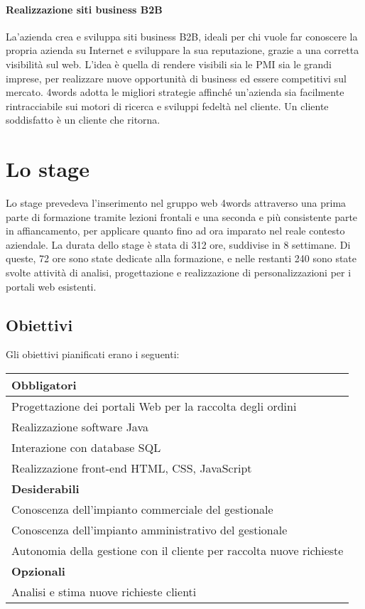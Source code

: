 \paragraph{Realizzazione siti business B2B} La'azienda crea e sviluppa siti business B2B, ideali per chi vuole far conoscere la propria azienda su Internet e sviluppare la sua reputazione, grazie a una corretta visibilità sul web.
L'idea è quella di rendere visibili sia le PMI sia le grandi imprese, per realizzare nuove opportunità di business ed essere competitivi sul mercato. 4words adotta le migliori strategie affinché un'azienda sia facilmente rintracciabile sui motori di ricerca e sviluppi fedeltà nel cliente. Un cliente soddisfatto è un cliente che ritorna.

\section{Lo stage}
Lo stage prevedeva l'inserimento nel gruppo web 4words attraverso una prima parte di formazione tramite lezioni frontali e una seconda e più consistente parte in affiancamento, per applicare quanto fino ad ora imparato nel reale contesto aziendale. La durata dello stage è stata di 312 ore, suddivise in 8 settimane. Di queste, 72 ore sono state dedicate alla formazione, e nelle restanti 240 sono state svolte attività di analisi, progettazione e realizzazione di personalizzazioni per i portali web esistenti.

\subsection{Obiettivi}
Gli obiettivi pianificati erano i seguenti:
\begin{table}[h]
	\centering
	\begin{tabular}{|l|}
		\hline
		\textbf{Obbligatori}\\
		\hline
		Progettazione dei portali Web per la raccolta degli ordini \\
		\hline
		Realizzazione software Java \\
		\hline
		Interazione con database SQL \\
		\hline
		Realizzazione front-end HTML, CSS, JavaScript \\
		\hline
		\textbf{Desiderabili}\\
		\hline
		Conoscenza dell'impianto commerciale del gestionale \\
		\hline
		Conoscenza dell'impianto amministrativo del gestionale \\
		\hline
		Autonomia della gestione con il cliente per raccolta nuove richieste \\
		\hline
		\textbf{Opzionali} \\
		\hline
		Analisi e stima nuove richieste clienti \\
		\hline
	\end{tabular}
	
\end{table}
